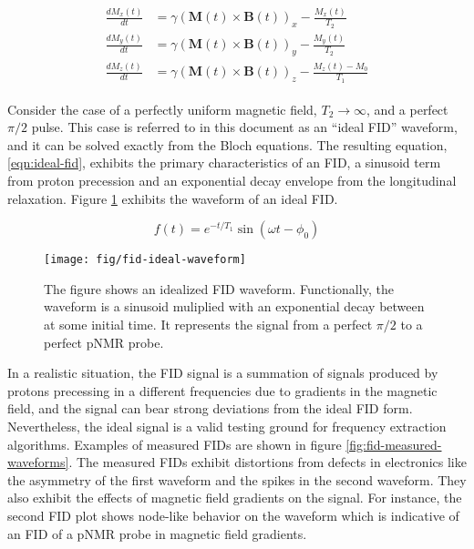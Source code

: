 \begin{align}
\begin{split}
\label{eqn:bloch}
\frac{dM_x(t)}{dt} & = \gamma (\mathbf{M}(t) \times \mathbf{B}(t))_x - \frac{M_x(t)}{T_2} \\
\frac{dM_y(t)}{dt} & = \gamma (\mathbf{M}(t)\times \mathbf{B}(t))_y - \frac{M_y(t)}{T_2} \\
\frac{dM_z(t)}{dt} & = \gamma (\mathbf{M}(t) \times \mathbf{B}(t))_z - \frac{M_z(t) - M_0}{T_1}
\end{split} 
\end{align}

Consider the case of a perfectly uniform magnetic field, $T_2 \rightarrow \infty$, and a perfect $\pi/2$ pulse. This case is referred to in this document as an ``ideal FID'' waveform, and it can be solved exactly from the Bloch equations.  The resulting equation, \ref{eqn:ideal-fid}, exhibits the primary characteristics of an FID, a sinusoid term from proton precession and an exponential decay envelope from the longitudinal relaxation.  Figure \ref{fig:fid-ideal-waveform} exhibits the waveform of an ideal FID.

\begin{equation}
f(t) = e^{-t/T_1} \sin(\omega t - \phi_0)
\label{eqn:ideal-fid}
\end{equation}

\begin{figure}
\centering
\texttt{[image: fig/fid-ideal-waveform]}
\caption{
    The figure shows an idealized FID waveform. Functionally, the waveform is a sinusoid muliplied with an exponential decay between at some initial time.  It represents the signal from a perfect $\pi/2$ to a perfect pNMR probe.
    \label{fig:fid-ideal-waveform}
}
\end{figure}

In a realistic situation, the FID signal is a summation of signals produced by protons precessing in a different frequencies due to gradients in the magnetic field, and the signal can bear strong deviations from the ideal FID form.  Nevertheless, the ideal signal is a valid testing ground for frequency extraction algorithms.  Examples of measured FIDs are shown in figure \ref{fig:fid-measured-waveforms}.  The measured FIDs exhibit distortions from defects in electronics like the asymmetry of the first waveform and the spikes in the second waveform.  They also exhibit the effects of magnetic field gradients on the signal.  For instance, the second FID plot shows node-like behavior on the waveform which is indicative of an FID of a pNMR probe in magnetic field gradients.

